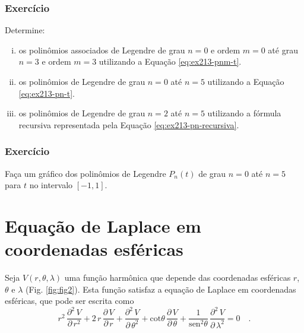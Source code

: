 \documentclass[10pt,a4paper,fleqn]{article}
\begin{document}
\begin{flushleft}
\dotfill
\end{flushleft}

\subsubsection{Exerc\'{i}cio}

Determine:
\begin{enumerate}[(i)]

\item os polin\^{o}mios associados de Legendre de grau $n = 0$ e ordem $m = 0$ at\'{e} grau $n = 3$ 
e ordem $m = 3$ utilizando a Equa\c{c}ão \ref{eq:ex213-pnm-t}.

\item os polin\^{o}mios de Legendre de grau $n = 0$ at\'{e} $n = 5$ utilizando a Equa\c{c}ão 
\ref{eq:ex213-pn-t}.

\item os polin\^{o}mios de Legendre de grau $n = 2$ at\'{e} $n = 5$ utilizando a 
f\'{o}rmula recursiva representada pela Equa\c{c}\~{a}o \ref{eq:ex213-pn-recursiva}.

\end{enumerate}

\subsubsection{Exerc\'{i}cio}

Fa\c{c}a um gr\'{a}fico dos polin\^{o}mios de Legendre $P_{n}(t)$ de grau 
$n = 0$ at\'{e} $n = 5$ para $t$ no intervalo $[-1,1]$. 

\begin{flushleft}
\dotfill
\end{flushleft}

\section{Equa\c{c}\~{a}o de Laplace em coordenadas esf\'{e}ricas}

Seja $V(r,\theta,\lambda)$ uma fun\c{c}\~{a}o harm\^{o}nica que depende das coordenadas esf\'{e}ricas $r$, $\theta$ e $\lambda$ 
(Fig. \ref{fig:fig2}). Esta fun\c{c}\~{a}o satisfaz a equa\c{c}\~{a}o de Laplace em coordenadas esf\'{e}ricas, que pode ser escrita como
\begin{equation}
r^{2} \, \frac{\partial^{2} \, V}{\partial \, r^{2}} +
2 \, r \, \frac{\partial \, V}{\partial \, r} +
\frac{\partial^{2} \, V}{\partial \, \theta^{2}} +
\text{cot} \theta \, \frac{\partial \, V}{\partial \, \theta} +
\frac{1}{\text{sen}^{2} \theta} \, \frac{\partial^{2} \, V}{\partial \, \lambda^{2}} = 0 \quad .
\label{eq:ex214-eq-Laplace-esferica}
\end{equation}
\end{document}
